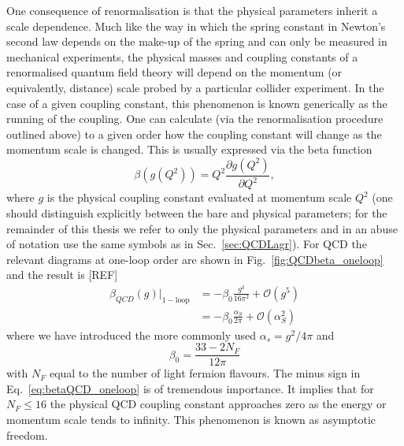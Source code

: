 \documentclass[12pt, a4paper, twoside]{book}
\newcommand{\brac}[1] {\!\left(#1\right)}
\begin{document}
One consequence of renormalisation is that the physical parameters inherit a scale dependence. Much like the way in which the spring constant in Newton's second law depends on the make-up of the spring and can only be measured in mechanical experiments, the physical masses and coupling constants of a renormalised quantum field theory will depend on the momentum (or equivalently, distance) scale probed by a particular collider experiment. In the case of a given coupling constant, this phenomenon is known generically as the running of the coupling. One can calculate (via the renormalisation procedure outlined above) to a given order how the coupling constant will change as the momentum scale is changed. This is usually expressed via the beta function
\begin{equation}
\label{eq:betafunc}
\beta\brac{g\brac{Q^2}}=Q^2\frac{\partial g\brac{Q^2}}{\partial Q^2},
\end{equation}
where \(g\) is the physical coupling constant evaluated at momentum scale \(Q^2\) (one should distinguish explicitly between the bare and physical parameters; for the remainder of this thesis we refer to only the physical parameters and in an abuse of notation use the same symbols as in Sec.~\ref{sec:QCDLagr}). For QCD the relevant diagrams at one-loop order are shown in Fig.~\ref{fig:QCDbeta_oneloop} and the result is [REF]
\begin{align}
\label{eq:betaQCD_oneloop}
\beta_{QCD}\brac{g}\lvert_{\mathrm{1-loop}}&=-\beta_0\frac{g^3}{16\pi^2}+\mathcal{O}\brac{g^5} \\[1.5ex]
&= -\beta_0\frac{\alpha_S}{2\pi}+\mathcal{O}\brac{\alpha_S^2} \label{eq:betaQCD_oneloop_alpha}
\end{align}
where we have introduced the more commonly used \(\alpha_s=g^2/4\pi\) and
\begin{equation}
\beta_0=\frac{33-2 N_F}{12\pi}
\end{equation}
with \(N_F\) equal to the number of light fermion flavours. The minus sign in Eq.~\eqref{eq:betaQCD_oneloop} is of tremendous importance. It implies that for \(N_F\leq 16\) the physical QCD coupling constant approaches zero as the energy or momentum scale tends to infinity. This phenomenon is known as asymptotic freedom.
\end{document}
